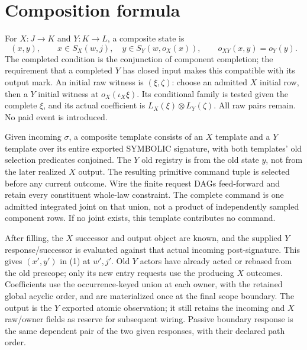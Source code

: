 \documentclass[11pt]{article}\usepackage{amsmath,amssymb,amsthm,geometry}\geometry{margin=1in}
\begin{document}
\section{Composition formula}
For $X:J\to K$ and $Y:K\to L$, a composite state is
\[
 (x,y),\qquad x\in S_X(w,j),\quad y\in S_Y(w,o_X(x)),
 \qquad o_{XY}(x,y)=o_Y(y).                              \tag{1}
\]
The completed condition is the conjunction of component completion; the requirement that a completed $Y$ has closed input makes this compatible with its output mark. An initial raw witness is $(\xi,\zeta)$: choose an admitted $X$ initial row, then a $Y$ initial witness at $o_X(\iota_X\xi)$. Its conditional family is tested given the complete $\xi$, and its actual coefficient is $L_X(\xi)\otimes L_Y(\zeta)$. All raw pairs remain. No paid event is introduced.

Given incoming $\sigma$, a composite template consists of an $X$ template and a $Y$ template over its entire exported SYMBOLIC signature, with both templates' old selection predicates conjoined. The $Y$ old registry is from the old state $y$, not from the later realized $X$ output. The resulting primitive command tuple is selected before any current outcome. Wire the finite request DAGs feed-forward and retain every constituent whole-law constraint. The complete command is one admitted integrated joint on that union, not a product of independently sampled component rows. If no joint exists, this template contributes no command.

After filling, the $X$ successor and output object are known, and the supplied $Y$ response/successor is evaluated against that actual incoming post-signature. This gives $(x',y')$ in (1) at $w',j'$. Old $Y$ actors have already acted or rebased from the old prescope; only its new entry requests use the producing $X$ outcomes. Coefficients use the occurrence-keyed union at each owner, with the retained global acyclic order, and are materialized once at the final scope boundary. The output is the $Y$ exported atomic observation; it still retains the incoming and $X$ raw/owner fields as reserve for subsequent wiring. Passive boundary response is the same dependent pair of the two given responses, with their declared path order.
\end{document}
